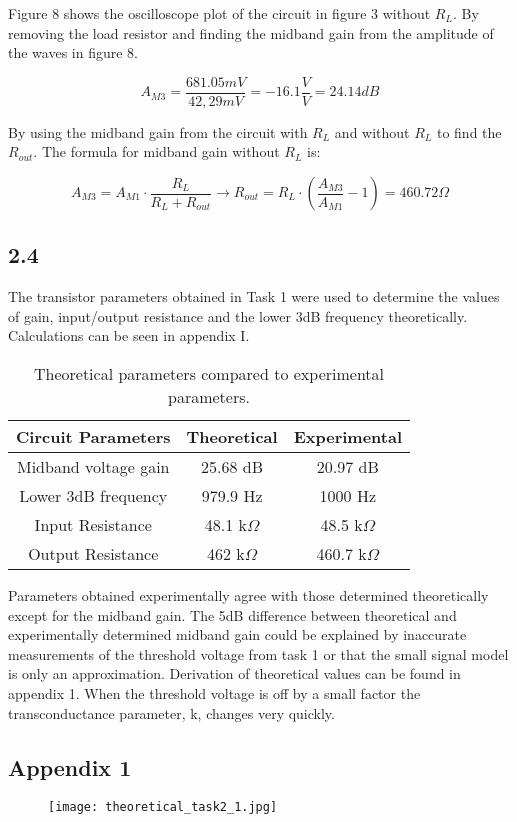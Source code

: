	Figure 8 shows the oscilloscope plot of the circuit in figure 3 without $R_{L}$. By removing the load resistor and finding the midband gain from the amplitude of the waves in figure 8.


	$$ A_{M3} = \frac{681.05 mV}{42,29 mV} = -16.1 \frac{V}{V} = 24.14 dB$$

	By using the midband gain from the circuit with $R_{L}$ and without $R_{L}$ to find the $R_{out}$. The formula for midband gain without $R_{L}$ is:


	$$ A_{M3} = A_{M1} \cdot \frac{R_{L}}{R_{L} + R_{out}} \rightarrow R_{out} = R_{L} \cdot (\frac{A_{M3}}{A_{M1}}-1) = 460.72 \Omega$$

\pagebreak




\subsection*{2.4}

The transistor parameters obtained in Task 1 were used to determine the values of gain, input/output resistance and the lower 3dB frequency theoretically. Calculations can be seen in appendix I.\\

\begin{table}[htbp]
    \centering
        \begin{tabular}{ c | c | c }
        \hline
        Circuit Parameters     &   Theoretical                  & Experimental \\
        \hline
        Midband voltage gain    &   25.68 dB			    &   20.97 dB\\
        Lower 3dB frequency     &   979.9 Hz                &   1000 Hz\\
        Input Resistance        &   48.1 k$\Omega$           &   48.5 k$\Omega$\\
        Output Resistance       &   462 k$\Omega$            &   460.7 k$\Omega$\\
        \end{tabular}%
    \caption{Theoretical parameters compared to experimental parameters.}
    \label{tab:addlabel}%
\end{table}%

Parameters obtained experimentally agree with those determined theoretically except for the midband gain. The 5dB difference between theoretical and experimentally determined midband gain could be explained by inaccurate measurements of the threshold voltage from task 1 or that the small signal model is only an approximation. Derivation of theoretical values can be found in appendix 1. When the threshold voltage is off by a small factor the  transconductance parameter, k, changes very quickly.

\pagebreak
\subsection*{Appendix 1}
\begin{figure}[h!]
\texttt{[image: theoretical\_task2\_1.jpg]}
\end{figure}

